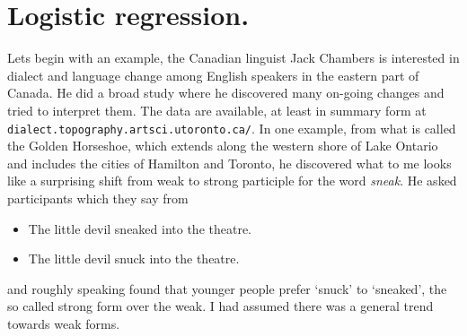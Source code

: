 \documentclass[12pt]{article}
\begin{document}
\section*{Logistic regression.} 

Lets begin with an example, the Canadian linguist Jack Chambers is
interested in dialect and language change among English speakers in
the eastern part of Canada. He did a broad study where he discovered
many on-going changes and tried to interpret them. The data are
available, at least in summary form at
\texttt{dialect.topography.artsci.utoronto.ca/}. In one example, from
what is called the Golden Horseshoe, which extends along the western
shore of Lake Ontario and includes the cities of Hamilton and Toronto,
he discovered what to me looks like a surprising shift from weak to
strong participle for the word \textsl{sneak}. He asked participants which they say from
\begin{itemize}
\item The little devil sneaked into the theatre.
\item The little devil snuck into the theatre.
\end{itemize}
and roughly speaking found that younger people prefer `snuck' to
`sneaked', the so called strong form over the weak. I had assumed
there was a general trend towards weak forms.
\end{document}
